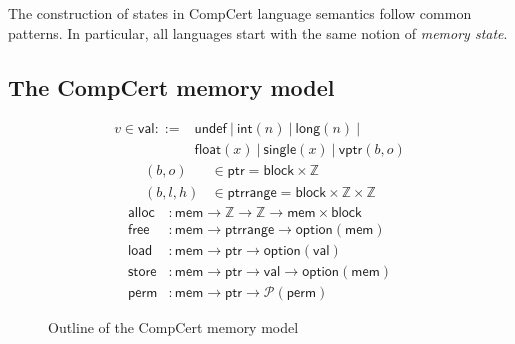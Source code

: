 \documentclass[sigplan,10pt,review,anonymous]{acmart}
\newcommand{\kw}[1]{\ensuremath{ \mathsf{#1} }}
\newcommand{\alt}{\ |\ } %
\begin{document}
%

The construction of states in CompCert language semantics
follow common patterns.
In particular,
all languages start with
the same notion of \emph{memory state}.


\subsection{The CompCert memory model} \label{sec:sem:mm} %

\begin{figure} %
  \begin{align*}
    v \in \kw{val} ::= {} &
          \kw{undef} \alt
          \kw{int}(n) \alt
          \kw{long}(n) \alt \\ &
          \kw{float}(x) \alt
          \kw{single}(x) \alt
          \kw{vptr}(b, o)
  \end{align*}
  \begin{align*}
    (b, o) &\in \kw{ptr} =
      \kw{block} \times \mathbb{Z}
    \\
    (b, l, h) &\in \kw{ptrrange} =
      \kw{block} \times \mathbb{Z} \times \mathbb{Z}
  \end{align*}
  \begin{align*}
    \kw{alloc} &:
      \kw{mem} \rightarrow \mathbb{Z} \rightarrow \mathbb{Z} \rightarrow
      \kw{mem} \times \kw{block}
    \\
    \kw{free} &:
      \kw{mem} \rightarrow
      \kw{ptrrange} \rightarrow
      \kw{option}(\kw{mem})
    \\
    \kw{load} &:
      \kw{mem} \rightarrow \kw{ptr} \rightarrow \kw{option}(\kw{val})
    \\
    \kw{store} &:
      \kw{mem} \rightarrow \kw{ptr} \rightarrow \kw{val} \rightarrow \kw{option}(\kw{mem})
    \\
    \kw{perm} &:
      \kw{mem} \rightarrow \kw{ptr} \rightarrow \mathcal{P}(\kw{perm})
  \end{align*}
  \caption{Outline of the CompCert memory model}
  \label{fig:mm}
\end{figure}
\end{document}
